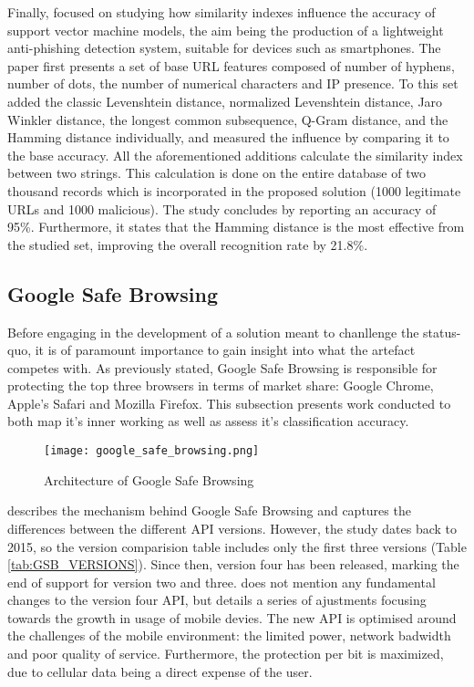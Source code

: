 Finally, \cite{SVM_SIMILARITY_INDEX} focused on studying how similarity indexes
influence the accuracy of support vector machine models, the aim being the
production of a lightweight anti-phishing detection system, suitable for devices
such as smartphones. The paper first presents a set of base URL features
composed of number of hyphens, number of dots, the number of numerical
characters and IP presence. To this set \cite{SVM_SIMILARITY_INDEX} added the
classic Levenshtein distance, normalized Levenshtein distance, Jaro Winkler
distance, the longest common subsequence, Q-Gram distance, and the Hamming
distance individually, and measured the influence by comparing it to the base
accuracy. All the aforementioned additions calculate the similarity index
between two strings. This calculation is done on the entire database of two
thousand records which is incorporated in the proposed solution (1000 legitimate
URLs and 1000 malicious). The study concludes by reporting an accuracy of 95\%.
Furthermore, it states that the Hamming distance is the most effective from the
studied set, improving the overall recognition rate by 21.8\%.


\subsection{Google Safe Browsing}
Before engaging in the development of a solution meant to chanllenge the status-quo, it is of paramount importance to gain insight into what the artefact competes with. As previously stated, Google Safe Browsing is responsible for protecting the top three browsers in terms of market share: Google Chrome, Apple's Safari and Mozilla Firefox. This subsection presents work conducted to both map it's inner working as well as assess it's classification accuracy.

\begin{figure}[h]
	\centering
	\texttt{[image: google\_safe\_browsing.png]}
	\caption{
		Architecture of Google Safe Browsing
		\citep{GOOGLE_SAFE_BROWSING_VERSIONS}}
	\label{fig:PHISHING_SOLUTION_CATEGS}
\end{figure}

\cite{GOOGLE_SAFE_BROWSING_VERSIONS} describes the mechanism behind Google Safe Browsing and captures the differences between the different API versions. However, the study dates back to 2015, so the version comparision table includes only the first three versions (Table \ref{tab:GSB_VERSIONS}). Since then, version four has been released, marking the end of support for version two and three.
\cite{GOOGLE_SAFE_BROWSING_V4} does not mention any fundamental changes to the version four API, but details a series of ajustments focusing towards the growth in usage of mobile devies. The new API is optimised around the challenges of the mobile environment: the limited power, network badwidth and poor quality of service. Furthermore, the protection per bit is maximized, due to cellular data being a direct expense of the user.

